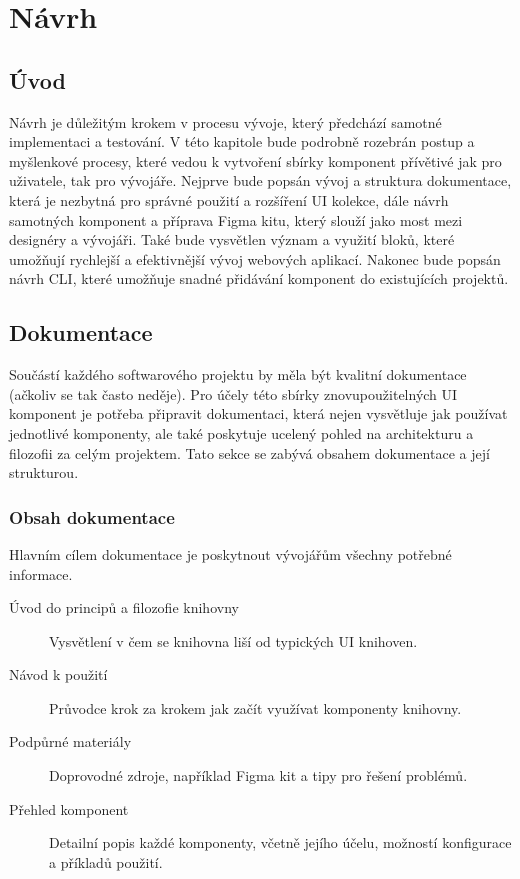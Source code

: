 
\chapter{Návrh}

\section{Úvod}
Návrh je důležitým krokem v procesu vývoje, který předchází samotné implementaci a testování. V této kapitole bude podrobně rozebrán postup a myšlenkové procesy, které vedou k vytvoření sbírky komponent přívětivé jak pro uživatele, tak pro vývojáře. Nejprve bude popsán vývoj a struktura dokumentace, která je nezbytná pro správné použití a rozšíření UI kolekce, dále návrh samotných komponent a příprava Figma kitu, který slouží jako most mezi designéry a vývojáři. Také bude vysvětlen význam a využití bloků, které umožňují rychlejší a efektivnější vývoj webových aplikací. Nakonec bude popsán návrh CLI, které umožňuje snadné přidávání komponent do existujících projektů.

\section{Dokumentace}
Součástí každého softwarového projektu by měla být kvalitní dokumentace (ačkoliv se tak často neděje). Pro účely této sbírky znovupoužitelných UI komponent je potřeba připravit dokumentaci, která nejen vysvětluje jak používat jednotlivé komponenty, ale také poskytuje ucelený pohled na architekturu a filozofii za celým projektem. Tato sekce se zabývá obsahem dokumentace a její strukturou.

\subsection{Obsah dokumentace}
Hlavním cílem dokumentace je poskytnout vývojářům všechny potřebné informace.

\begin{description}
  \item[Úvod do principů a filozofie knihovny] Vysvětlení v čem se knihovna liší od typických UI knihoven.
  \item[Návod k použití] Průvodce krok za krokem jak začít využívat komponenty knihovny.
  \item[Podpůrné materiály] Doprovodné zdroje, například Figma kit a tipy pro řešení problémů.
  \item[Přehled komponent] Detailní popis každé komponenty, včetně jejího účelu, možností konfigurace a příkladů použití.
\end{description}

